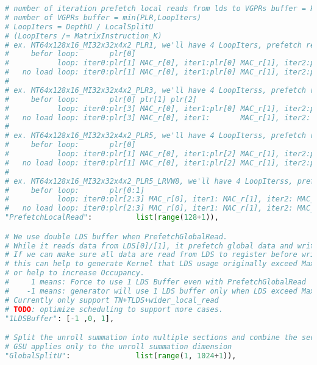 \documentclass[]{article}
\begin{document}
\begin{lstlisting}[language=python,breaklines=true]
# number of iteration prefetch local reads from lds to VGPRs buffer = PLR % LoopIter
# number of VGPRs buffer = min(PLR,LoopIters)
# LoopIters = DepthU / LocalSplitU
# (LoopIters /= MatrixInstruction_K)
# ex. MT64x128x16_MI32x32x4x2_PLR1, we'll have 4 LoopIters, prefetch read 1 iteration, with 2 VGPRs buffer
#     befor loop:       plr[0]
#           loop: iter0:plr[1] MAC_r[0], iter1:plr[0] MAC_r[1], iter2:plr[1] MAC_r[0], iter3:plr[0] MAC_r[1]
#   no load loop: iter0:plr[1] MAC_r[0], iter1:plr[0] MAC_r[1], iter2:plr[1] MAC_r[0], iter3:       MAC_r[1]
#
# ex. MT64x128x16_MI32x32x4x2_PLR3, we'll have 4 LoopIterss, prefetch read 3 iteration, with 4 VGPRs buffer
#     befor loop:       plr[0] plr[1] plr[2]
#           loop: iter0:plr[3] MAC_r[0], iter1:plr[0] MAC_r[1], iter2:plr[1] MAC_r[2], iter3:plr[2] MAC_r[3]
#   no load loop: iter0:plr[3] MAC_r[0], iter1:       MAC_r[1], iter2:       MAC_r[2], iter3:       MAC_r[3]
#
# ex. MT64x128x16_MI32x32x4x2_PLR5, we'll have 4 LoopIterss, prefetch read 5%4=1 iteration, with 4 VGPRs buffer
#     befor loop:       plr[0]
#           loop: iter0:plr[1] MAC_r[0], iter1:plr[2] MAC_r[1], iter2:plr[3] MAC_r[2], iter3:plr[0] MAC_r[3]
#   no load loop: iter0:plr[1] MAC_r[0], iter1:plr[2] MAC_r[1], iter2:plr[3] MAC_r[2], iter3:       MAC_r[3]
#
# ex. MT64x128x16_MI32x32x4x2_PLR5_LRVW8, we'll have 4 LoopIterss, prefetch read 5%4=1 iteration, with 4 VGPRs buffer, each read read 2 iterations
#     befor loop:       plr[0:1]
#           loop: iter0:plr[2:3] MAC_r[0], iter1: MAC_r[1], iter2: MAC_r[2], iter3:plr[0:1] MAC_r[3]
#   no load loop: iter0:plr[2:3] MAC_r[0], iter1: MAC_r[1], iter2: MAC_r[2], iter3:         MAC_r[3]
"PrefetchLocalRead":          list(range(128+1)),

# We use double LDS buffer when PrefetchGlobalRead.
# While it reads data from LDS[0]/[1], it prefetch global data and writes to LDS[1]/[0]
# If we can make sure all data are read from LDS to register before writing data to LDS, we can use 1 LDS buffer to save LDS memory.
# this can help to generate Kernel that LDS usage originally exceed MaxLDS if using double LDS buffer,
# or help to increase Occupancy.
#     1 means: Force to use 1 LDS Buffer even with PrefetchGlobalRead
#    -1 means: generator will use 1 LDS buffer only when LDS exceed MaxLDS
# Currently only support TN+TLDS+wider_local_read
# TODO: optimize scheduling to support more cases.
"1LDSBuffer": [-1 ,0, 1],

# Split the unroll summation into multiple sections and combine the sections
# GSU applies only to the unroll summation dimension
"GlobalSplitU":               list(range(1, 1024+1)),


\end{lstlisting}
\end{document}
